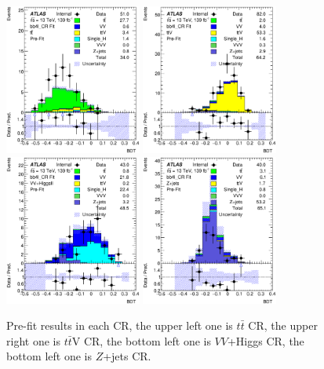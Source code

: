 \begin{figure}[h!]
	\caption{Pre-fit results in each CR, the upper left one is $t\bar{t}$ CR, the upper right one is $t\bar{t}$V CR, the bottom left one is $VV$+Higgs CR, the bottom left one is $Z$+jets CR.}
	\label{Fig.CRs pre-fit}
	\centering
	\includegraphics[width=0.4\textwidth]{figures/4lbb/Plots/tt_CR.eps}
	\includegraphics[width=0.4\textwidth]{figures/4lbb/Plots/ttV_CR.eps}
	\includegraphics[width=0.4\textwidth]{figures/4lbb/Plots/VVHiggsII_CR.eps}
	\includegraphics[width=0.4\textwidth]{figures/4lbb/Plots/Zjets_CR.eps}
\end{figure}

